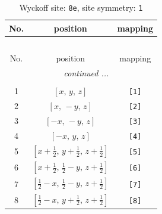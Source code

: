 \documentclass[fleqn,8pt]{jsarticle}
\begin{document}
\renewcommand{\arraystretch}{1.2}
\begin{longtable}{ccc}
\caption{Wyckoff site: {\tt 8e}, site symmetry: {\tt 1}}
 \\
 \hline \hline
No. & position & mapping \\ \hline \endfirsthead

\multicolumn{2}{l}{\tablename\ \thetable{}} \\
 \hline \hline
No. & position & mapping \\ \hline \endhead

 \hline \hline
\multicolumn{2}{r}{\footnotesize\it continued ...} \\ \endfoot

 \hline \hline
\multicolumn{2}{r}{} \\ \endlastfoot

1 & $\left[ x,\, y,\, z \right]$ & {\tt [1]} \\ \hline
2 & $\left[ x,\, - y,\, z \right]$ & {\tt [2]} \\ \hline
3 & $\left[ - x,\, - y,\, z \right]$ & {\tt [3]} \\ \hline
4 & $\left[ - x,\, y,\, z \right]$ & {\tt [4]} \\ \hline
5 & $\left[ x + \frac{1}{2},\, y + \frac{1}{2},\, z + \frac{1}{2} \right]$ & {\tt [5]} \\ \hline
6 & $\left[ x + \frac{1}{2},\, \frac{1}{2} - y,\, z + \frac{1}{2} \right]$ & {\tt [6]} \\ \hline
7 & $\left[ \frac{1}{2} - x,\, \frac{1}{2} - y,\, z + \frac{1}{2} \right]$ & {\tt [7]} \\ \hline
8 & $\left[ \frac{1}{2} - x,\, y + \frac{1}{2},\, z + \frac{1}{2} \right]$ & {\tt [8]} \\
\end{longtable}
\end{document}
